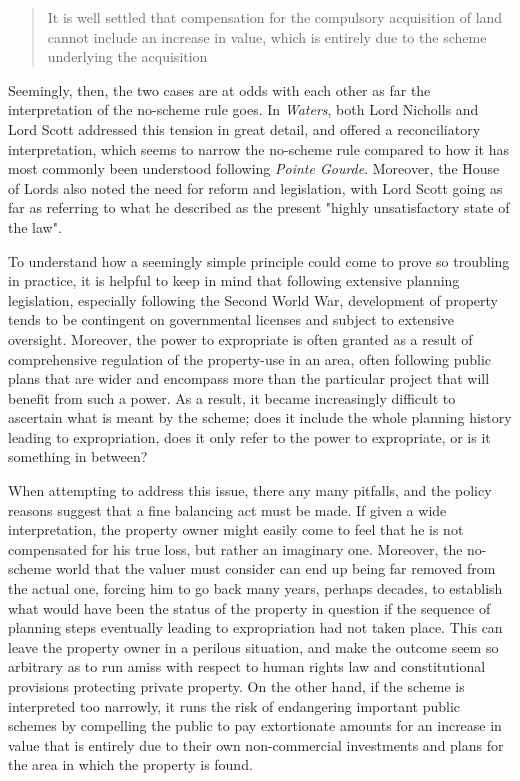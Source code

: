 \begin{quote}
It is well settled that compensation for the compulsory acquisition of
land cannot include an increase in value, which is entirely due to the
scheme underlying the acquisition
\end{quote}

Seemingly, then, the two cases are at odds with each other as far the interpretation of the no-scheme rule goes. In \emph{Waters}, both Lord Nicholls and Lord Scott addressed this tension in great detail, and offered a reconciliatory interpretation, which seems to narrow the no-scheme rule compared to how it has most commonly been understood following \emph{Pointe Gourde}. Moreover, the House of Lords also noted the need for reform and legislation, with Lord Scott going as far as referring to what he described as the present "highly unsatisfactory state of the law".

To understand how a seemingly simple principle could come to prove so troubling in practice, it is helpful to keep in mind that following extensive planning legislation, especially following the Second World War, development of property tends to be contingent on governmental licenses and subject to extensive oversight. Moreover, the power to expropriate is often granted as a result of comprehensive regulation of the property-use in an area, often following public plans that are wider and encompass more than the particular project that will benefit from such a power. As a result, it became increasingly difficult to ascertain what is meant by the scheme; does it include the whole planning history leading to expropriation, does it only refer to the power to expropriate, or is it something in between?

When attempting to address this issue, there any many pitfalls, and the policy reasons suggest that a fine balancing act must be made. If given a wide interpretation, the property owner might easily come to feel that he is not compensated for his true loss, but rather an imaginary one. Moreover, the no-scheme world that the valuer must consider can end up being far removed from the actual one, forcing him to go back many years, perhaps decades, to establish what would have been the status of the property in question if the sequence of planning steps eventually leading to expropriation had not taken place. This can leave the property owner in a perilous situation, and make the outcome seem so arbitrary as to run amiss with respect to human rights law and constitutional provisions protecting private property. On the other hand, if the scheme is interpreted too narrowly, it runs the risk of endangering important public schemes by compelling the public to pay extortionate amounts for an increase in value that is entirely due to their own non-commercial investments and plans for the area in which the property is found.

